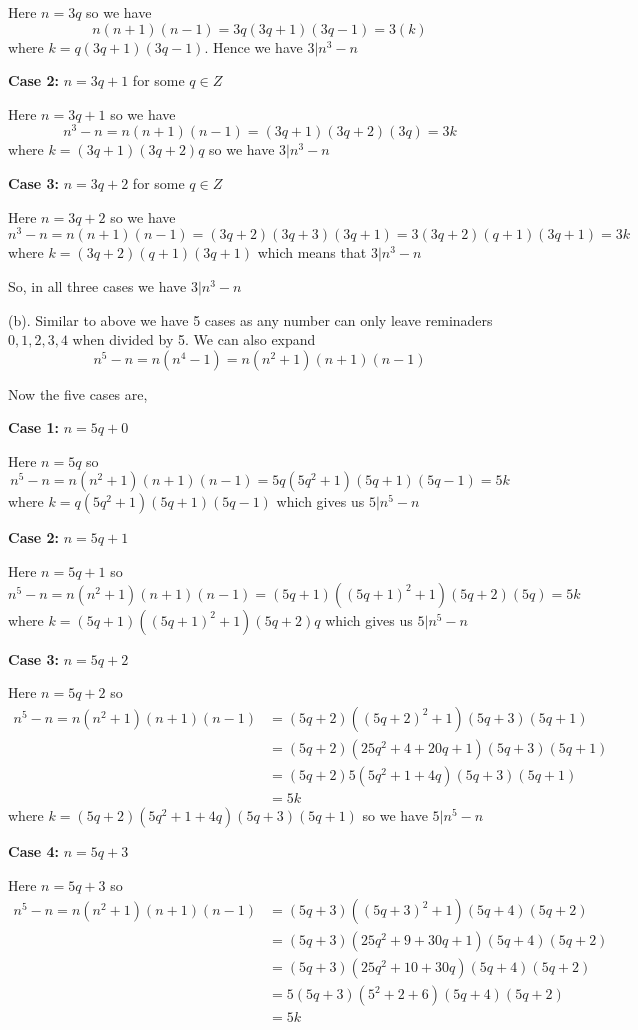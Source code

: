 \documentclass[12pt]{exam}
\begin{document}
\begin{questions}
 Here $n  = 3q$ so we have  $$n(n + 1)(n - 1) = 3q(3q + 1)(3q - 1) = 3(k)$$  where $k = q(3q + 1)(3q - 1) $. Hence we have $3 | n^{3} - n$

\textbf{Case 2:} $n = 3q + 1$ for some  $q \in Z$

 Here $n = 3q + 1$ so we have  $$n^{3} -n = n(n + 1)(n - 1) = (3q + 1 )(3q + 2)(3q) = 3k$$ where $k = (3q + 1 )(3q + 2)q$ so we have $3 | n^{3} - n$

\textbf{Case 3:} $n = 3q + 2$ for some  $q \in Z$

 Here $n = 3q + 2$ so we have  $$n^{3} - n = n (n + 1)(n - 1) = (3q + 2)(3q + 3)(3q + 1) = 3 (3q + 2)(q + 1)(3q + 1) = 3k$$ where $k =(3q + 2)(q + 1)(3q + 1)  $ which means that $3 | n^{3} - n$

So, in all three cases we have $3 | n^{3} - n$

(b). Similar to above we have 5 cases as any number can only leave reminaders $0, 1, 2, 3, 4$ when divided by 5. We can also expand $$n^{5} - n = n(n^{4} - 1) = n(n^2 + 1)(n + 1)(n - 1)$$


Now the five cases are,


\textbf{Case 1:}  $n = 5q + 0$

 Here $n = 5q$ so  $$n^{5} - n = n(n^2 + 1)(n + 1)(n - 1) = 5q(5q^2 + 1)(5q + 1)(5q - 1) = 5k$$ where $k = q(5q^2 + 1)(5q + 1)(5q - 1)$ which gives us $5 | n^{5} - n$

\textbf{Case 2:}  $n = 5q + 1$

 Here $n = 5q + 1$ so  $$n^{5} - n = n(n^2 + 1)(n + 1)(n - 1) = (5q + 1)((5q + 1)^2 + 1)(5q + 2)(5q) = 5k$$ where $k =  (5q + 1)((5q + 1)^2 + 1)(5q + 2)q$ which gives us $5 | n^{5} - n$

\textbf{Case 3:}  $n = 5q + 2$

 Here $n = 5q + 2$ so  
 \begin{align*}
     n^{5} - n = n(n^2 + 1)(n + 1)(n - 1) &= (5q + 2)((5q + 2)^2 + 1)(5q  + 3)(5q + 1)\\
                                          &= (5q + 2)(25q^2 + 4 + 20q + 1)(5q + 3)(5q + 1)\\
                                          &= (5q + 2)5(5q^2 + 1 + 4q)(5q + 3)(5q + 1)\\
                                          &= 5k
 \end{align*}
 where $k = (5q + 2)(5q^2 + 1 + 4q)(5q + 3)(5q + 1)$ so we have  $5 | n^{5} - n$

 \textbf{Case 4:}  $n = 5q + 3$

 Here $n = 5q + 3$ so  
 \begin{align*}
     n^{5} - n = n(n^2 + 1)(n + 1)(n - 1) &= (5q + 3)((5q + 3)^2 + 1)(5q + 4)(5q + 2) \\
                                          &=  (5q + 3)(25q^2 + 9 + 30q + 1)(5q + 4)(5q + 2) \\
                                          &=  (5q + 3)(25q^2 + 10 + 30q)(5q + 4)(5q + 2) \\
                                          &=  5(5q + 3)(5^2 + 2 + 6)(5q + 4)(5q + 2) \\
                                          &=  5k
 \end{align*}


\end{questions}
\end{document}
